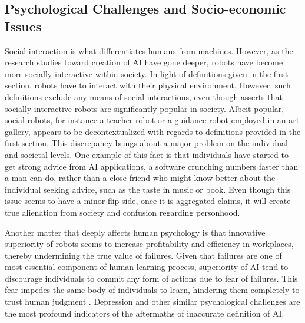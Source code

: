 \documentclass[man]{apa6}
\begin{document}
\subsection{Psychological Challenges and Socio-economic Issues}
Social interaction is what differentiates humans from machines.
However, as the research studies toward creation of AI have gone deeper, robots have become more socially interactive within society.
In light of definitions given in the first section, robots have to interact with their physical environment.
However, such definitions exclude any means of social interactions, even though  asserts that socially interactive robots are significantly popular in society.
Albeit popular, social robots, for instance a teacher robot or a guidance robot employed in an art gallery, appears to be decontextualized with regards to definitions provided in the first section.
This discrepancy brings about a major problem on the individual and societal levels.
One example of this fact is that individuals have started to get strong advice from AI applications, a software crunching numbers faster than a man can do, rather than a close friend who might know better about the individual seeking advice, such as the taste in music or book.
Even though this issue seems to have a minor flip-side, once it is aggregated  claims, it will create true alienation from society and confusion regarding personhood. \par
Another matter that deeply affects human psychology is that innovative superiority of robots seems to increase profitability and efficiency in workplaces, thereby undermining the true value of failures.
Given that failures are one of most essential component of human learning process, superiority of AI tend to discourage individuals to commit any form of actions due to fear of failures. 
This fear impedes the same body of individuals to learn, hindering them completely to trust human judgment .
Depression and other similar psychological challenges are the most profound indicators of the aftermaths of inaccurate definition of AI. \par
\end{document}

